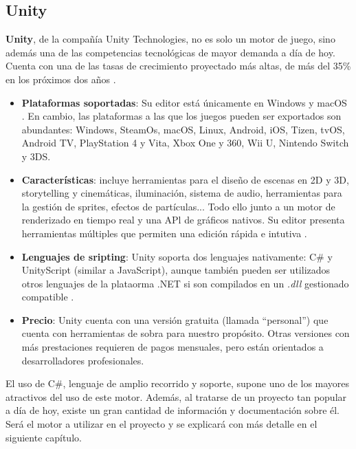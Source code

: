 \subsection{Unity}
\textbf{Unity}, de la compañía Unity Technologies, no es solo un motor de juego, sino además una de las competencias tecnológicas de mayor demanda a día de hoy. Cuenta con una de las tasas de crecimiento proyectado más altas, de más del 35\% en los próximos dos años \cite{learnunity}.
\begin{itemize}
\item \textbf{Plataformas soportadas}: Su editor está únicamente en Windows y macOS \cite{srunity}. En cambio, las plataformas a las que los juegos pueden ser exportados son abundantes: Windows, SteamOs, macOS, Linux, Android, iOS, Tizen, tvOS, Android TV, PlayStation 4 y Vita, Xbox One y 360, Wii U, Nintendo Switch y 3DS.
\item \textbf{Características}: incluye herramientas para el diseño de escenas en 2D y 3D, storytelling y cinemáticas, iluminación, sistema de audio, herramientas para la gestión de sprites, efectos de partículas... Todo ello junto a un motor de renderizado en tiempo real y una APl de gráficos nativos. Su editor presenta herramientas múltiples que permiten una edición rápida e intutiva \cite{featuresunity}.
\item \textbf{Lenguajes de sripting}: Unity soporta dos lenguajes nativamente: C\# y UnityScript (similar a JavaScript), aunque también pueden ser utilizados otros lenguajes de la plataorma .NET si son compilados en un \textit{.dll} gestionado compatible \cite{languagesunity}.
\item \textbf{Precio}: Unity cuenta con una versión gratuita (llamada ``personal'') que cuenta con herramientas de sobra para nuestro propósito. Otras versiones con más prestaciones requieren de pagos mensuales, pero están orientados a desarrolladores profesionales.
\end{itemize}

El uso de C\#, lenguaje de amplio recorrido y soporte, supone uno de los mayores atractivos del uso de este motor. Además, al tratarse de un proyecto tan popular a día de hoy, existe un gran cantidad de información y documentación sobre él. Será el motor a utilizar en el proyecto y se explicará con más detalle en el siguiente capítulo.